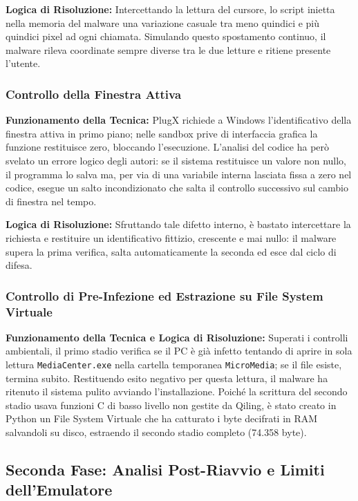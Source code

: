 \documentclass[11pt, a4paper]{article}
\begin{document}
	\textbf{Logica di Risoluzione:} Intercettando la lettura del cursore, lo script inietta nella memoria del malware una variazione casuale tra meno quindici e più quindici pixel ad ogni chiamata. Simulando questo spostamento continuo, il malware rileva coordinate sempre diverse tra le due letture e ritiene presente l'utente.
	
	\subsubsection{Controllo della Finestra Attiva}
	
	\textbf{Funzionamento della Tecnica:} PlugX richiede a Windows l'identificativo della finestra attiva in primo piano; nelle sandbox prive di interfaccia grafica la funzione restituisce zero, bloccando l'esecuzione. L'analisi del codice ha però svelato un errore logico degli autori: se il sistema restituisce un valore non nullo, il programma lo salva ma, per via di una variabile interna lasciata fissa a zero nel codice, esegue un salto incondizionato che salta il controllo successivo sul cambio di finestra nel tempo.
	
	\textbf{Logica di Risoluzione:} Sfruttando tale difetto interno, è bastato intercettare la richiesta e restituire un identificativo fittizio, crescente e mai nullo: il malware supera la prima verifica, salta automaticamente la seconda ed esce dal ciclo di difesa.
	
	\subsubsection{Controllo di Pre-Infezione ed Estrazione su File System Virtuale}
	
	\textbf{Funzionamento della Tecnica e Logica di Risoluzione:} Superati i controlli ambientali, il primo stadio verifica se il PC è già infetto tentando di aprire in sola lettura \texttt{MediaCenter.exe} nella cartella temporanea \texttt{MicroMedia}; se il file esiste, termina subito. Restituendo esito negativo per questa lettura, il malware ha ritenuto il sistema pulito avviando l'installazione. Poiché la scrittura del secondo stadio usava funzioni C di basso livello non gestite da Qiling, è stato creato in Python un File System Virtuale che ha catturato i byte decifrati in RAM salvandoli su disco, estraendo il secondo stadio completo (74.358 byte).
	
	\subsection{Seconda Fase: Analisi Post-Riavvio e Limiti dell'Emulatore}
	
\end{document}
